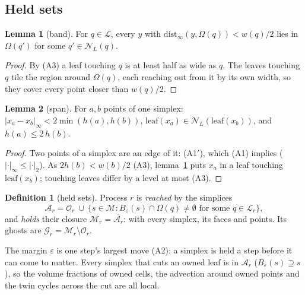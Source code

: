 \documentclass[10pt,a4paper]{article}
\theoremstyle{definition}
\newtheorem{definition}{Definition}
\newtheorem{lemma}{Lemma}
\begin{document}
\subsection{Held sets}
\label{sec:part-ghost}

\begin{lemma}[band]
  \label{lem:band}
  For $q \in \mathcal{L}$, every $y$ with $\mathrm{dist}_\infty(y,
  \Omega(q)) < w(q)/2$ lies in $\Omega(q')$ for some $q' \in
  \mathcal{N}_L(q)$.
\end{lemma}
\begin{proof}
  By (A3) a leaf touching $q$ is at least half as wide as $q$. The leaves
  touching $q$ tile the region around $\Omega(q)$, each reaching out from it
  by its own width, so they cover every point closer than $w(q)/2$.
\end{proof}

\begin{lemma}[span]
  \label{lem:span}
  For $a, b$ points of one simplex: $|x_a - x_b|_\infty < 2\min(h(a),
  h(b))$, $\mathrm{leaf}(x_a) \in \mathcal{N}_L(\mathrm{leaf}(x_b))$, and
  $h(a) \le 2\,h(b)$.
\end{lemma}
\begin{proof}
  Two points of a simplex are an edge of it: (A1$'$), which (A1) implies
  ($|\cdot|_\infty \le |\cdot|_2$). As $2h(b) < w(b)/2$ (A3), lemma~\ref{lem:band} puts $x_a$ in a
  leaf touching $\mathrm{leaf}(x_b)$; touching leaves differ by a level at
  most (A3).
\end{proof}

\begin{definition}[held sets]
  \label{def:held}
  Process $r$ is \emph{reached} by the simplices
  \[
    \mathcal{A}_r = \mathcal{O}_r \ \cup\ \{ s \in \mathcal{M} :
      B_\varepsilon(s) \cap \Omega(q) \ne \emptyset \text{ for some } q
      \in \mathcal{L}_r \},
  \]
  and \emph{holds} their closure $\mathcal{M}_r = \overline{\mathcal{A}_r}$:
  with every simplex, its faces and points. Its ghosts are $\mathcal{G}_r =
  \mathcal{M}_r \setminus \mathcal{O}_r$.
\end{definition}

The margin $\varepsilon$ is one step's largest move (A2): a simplex is
held a step before it can come to matter. Every simplex that cuts an owned
leaf is in $\mathcal{A}_r$ ($B_\varepsilon(s) \supseteq s$), so the
volume fractions of owned cells, the advection around owned points and the
twin cycles across the cut are all local.
\end{document}
